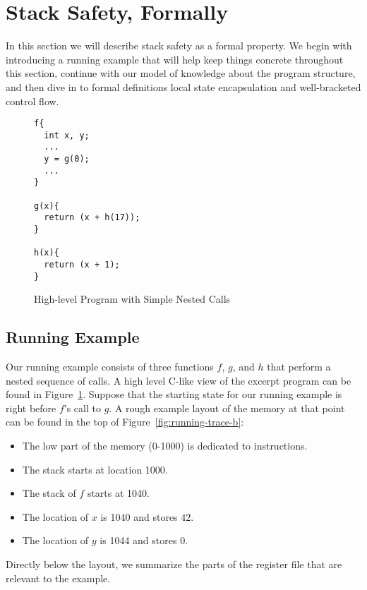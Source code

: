 \documentclass[acmsmall,review,anonymous]{acmart}\settopmatter{printfolios=true,printccs=false,printacmref=false}
\begin{document}
\section{Stack Safety, Formally}
\label{sec:lse-and-wbcf}

In this section we will describe stack safety as a formal property. We
begin with introducing a running example that will help keep things
concrete throughout this section, continue with our model of
 knowledge about the program structure, and
then dive in to formal definitions local state encapsulation and
well-bracketed control flow.

\begin{figure}[b]
  \begin{centering}
    \begin{minipage}{0.5\textwidth}
\begin{verbatim}
f{
  int x, y;
  ...
  y = g(0);
  ...
}

g(x){
  return (x + h(17));
}

h(x){
  return (x + 1);
}
\end{verbatim}
\end{minipage}
\end{centering}
\caption{High-level Program with Simple Nested Calls}
\label{fig:running-program}
\end{figure}

\subsection{Running Example}

Our running example consists of three functions $f$, $g$, and $h$ that
perform a nested sequence of calls. A high level C-like view of the
excerpt program can be found in Figure~\ref{fig:running-program}.
Suppose that the starting state for our running example is right
before $f$'s call to $g$. A rough example layout of the memory at that
point can be found in the top of Figure~\ref{fig:running-trace-b}:
\begin{itemize}
\item The low part of the memory (0-1000) is dedicated to instructions.
\item The stack starts at location 1000.
\item The stack of $f$ starts at 1040.
\item The location of $x$ is 1040 and stores $42$.
\item The location of $y$ is 1044 and stores $0$.
\end{itemize}
Directly below the layout, we summarize the parts of the register file
that are relevant to the example.
\end{document}
